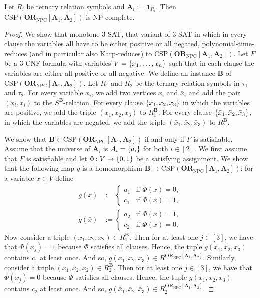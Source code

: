\documentclass[a4paper,english, thm-restate]{lipics-v2021}
\DeclarePairedDelimiter\set{\lbrace}{\rbrace}
\newcommand{\sig}{\tau}
\newcommand{\StructA}{\mathbf{A}}
\newcommand{\StructB}{\mathbf{B}}
\newcommand{\CSP}[1]{\mathrm{CSP}(#1)}
\newcommand{\ORNPC}[1]{\mathbf{OR}_\text{NPC}[#1]}
\newcommand{\onestruc}[1]{\mathbf{1}_{#1}}
\begin{document}
	\begin{lemma}
		\label{lem:intractable-or-NPC-basic}
		Let $R_i$ be ternary relation symbols and
		$\StructA_i := \onestruc{R_i}$.
		Then $\CSP{\ORNPC{\StructA_1,\StructA_2}}$ is NP-complete.
	\end{lemma}
	\begin{proof}
		We show that monotone $3$-SAT,
		that variant of $3$-SAT in which in every clause the variables all have to be either positive or all negated,
		polynomial-time-reduces (and in particular also Karp-reduces) to $\CSP{\ORNPC{\StructA_1,\StructA_2}}$.
		Let $F$ be a $3$-CNF formula with variables $V = \set{x_1, \dots, x_n}$
		such that in each clause the variables are either all positive or all negative.
		We define an instance $\StructB$ of $\CSP{\ORNPC{\StructA_1,\StructA_2}}$.
		Let $R_1$ and $R_2$ be the ternary relation symbols in $\sig_1$ and $\sig_2$.
		For every variable $x_i$, we add two vertices $x_i$ and $\bar{x}_i$
		and add the pair $(x_i, \bar{x}_i)$ to the $S^\StructB$-relation.
		For every clause $\set{x_1, x_2,x_3}$
		in which the variables are positive,
		we add the triple $(x_1,x_2,x_3)$ to $R_1^\StructB$.
		For every clause $\set{\bar{x}_1, \bar{x}_2, \bar{x}_3}$,
		in which the variables are negated,
		we add the triple $(\bar{x}_1,\bar{x}_2,\bar{x}_3)$ to $R_2^\StructB$.
		
		We show that $\StructB \in \CSP{\ORNPC{\StructA_1,\StructA_2}}$ if and only if $F$ is satisfiable.
		Assume that the universe of $\StructA_i$ is $A_i = \set{a_i}$ for both $i\in[2]$.
		We first assume that $F$ is satisfiable and let $\Phi\colon V \to \set{0,1}$ be a satisfying assignment.
		We show that the following map $g$ is a homomorphism $\StructB \to \CSP{\ORNPC{\StructA_1,\StructA_2}}$: for a variable $x\in V$ define
		\begin{align*}g(x) &:= \begin{cases}
				a_1 & \text {if } \Phi(x) = 0,\\
				c_1 & \text {if } \Phi(x) = 1,
			\end{cases}\\
			g(\bar{x}) &:= \begin{cases}
				a_2 & \text {if } \Phi(x) = 1,\\
				c_2 & \text {if } \Phi(x) = 0.
			\end{cases}
		\end{align*}
		Now consider a triple $(x_1,x_2,x_2) \in R_1^\StructB$.
		Then for at least one $j \in[3]$, we have that $\Phi(x_j) = 1$ because
		$\Phi$ satisfies all clauses.
		Hence, the tuple $g(x_1,x_2,x_3)$ contains $c_1$ at least once.
		And so, $g(x_1,x_2,x_3) \in R^{\ORNPC{\StructA_1,\StructA_2}}$.
		Similarly, consider a triple $(\bar{x}_1,\bar{x}_2,\bar{x}_2) \in R_2^\StructB$.
		Then for at least one $j \in[3]$, we have that $\Phi(x_j) = 0$ because
		$\Phi$ satisfies all clauses.
		Hence, the tuple $g(\bar{x}_1,\bar{x}_2,\bar{x}_3)$ contains $c_2$ at least once. 
		And so, $g(\bar{x}_1,\bar{x}_2,\bar{x}_3) \in R_2^{\ORNPC{\StructA_1,\StructA_2}}$.
		

\end{proof}
\end{document}
